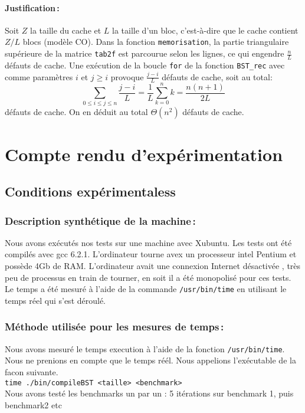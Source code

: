\documentclass[a4paper, 10pt, french]{article}
\begin{document}
    \paragraph{Justification\,: }
    Soit $Z$ la taille du cache et $L$ la taille d'un bloc, c'est-à-dire que le cache contient $Z/L$ blocs (modèle CO).
Dans la fonction \texttt{memorisation}, la partie triangulaire supérieure de la matrice \texttt{tab2f} est parcourue selon les lignes, ce qui engendre $\frac{n}{L}$ défauts de cache.
Une exécution de la boucle \texttt{for} de la fonction \texttt{BST\_rec} avec comme paramètres $i$ et $j\geq i$ provoque $\frac{j-i}{L}$ défauts de cache, soit au total: $$\sum_{0\leq i\leq j\leq n}\frac{j-i}{L}=\frac{1}{L}\sum_{k=0}^n k=\frac{n(n+1)}{2L}$$ défauts de cache. On en déduit au total $\Theta(n^2)$ défauts de cache.



\section{Compte rendu d'expérimentation}
  \subsection{Conditions expérimentaless}


    \subsubsection{Description synthétique de la machine\,:}
Nous avons exécutés nos tests sur une machine avec Xubuntu. Les tests ont été compilés avec gcc 6.2.1.
L'ordinateur tourne avex un processeur intel Pentium et possède 4Gb de RAM.
L'ordinateur avait une connexion Internet désactivée , très peu de processus en train de tourner, en soit il a été monopolisé pour ces tests.
Le temps a été mesuré à l'aide de la commande \texttt{/usr/bin/time} en utilisant le temps réel qui s'est déroulé.

    \subsubsection{Méthode utilisée pour les mesures de temps\,: }
Nous avons mesuré le temps execution à l'aide de la fonction \texttt{/usr/bin/time}.
Nous ne prenions en compte que le temps réél. Nous appelions l'exécutable de la facon suivante.\\
\texttt{time ./bin/compileBST <taille> <benchmark>}\\
	Nous avons testé les benchmarks un par un : 5 itérations sur benchmark 1, puis benchmark2 etc
\end{document}
